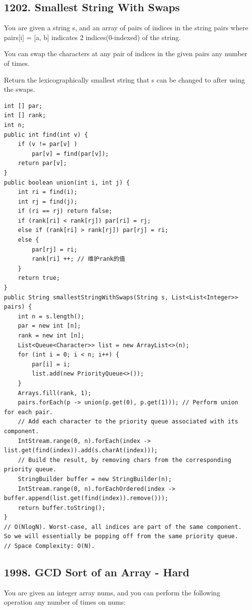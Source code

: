 \documentclass[9pt, b5paaper]{book}
\begin{document}
\subsection{1202. Smallest String With Swaps}
\label{sec-10-0-5}
You are given a string s, and an array of pairs of indices in the string pairs where pairs[i] = [a, b] indicates 2 indices(0-indexed) of the string.

You can swap the characters at any pair of indices in the given pairs any number of times.

Return the lexicographically smallest string that s can be changed to after using the swaps.
\begin{verbatim}
int [] par;
int [] rank;
int n;
public int find(int v) {
    if (v != par[v] ) 
        par[v] = find(par[v]);
    return par[v];
}
public boolean union(int i, int j) {
    int ri = find(i);
    int rj = find(j);
    if (ri == rj) return false;
    if (rank[ri] < rank[rj]) par[ri] = rj;
    else if (rank[ri] > rank[rj]) par[rj] = ri;
    else {
        par[rj] = ri;
        rank[ri] ++; // 维护rank的值
    }
    return true;
}
public String smallestStringWithSwaps(String s, List<List<Integer>> pairs) {
    int n = s.length();
    par = new int [n];
    rank = new int [n];
    List<Queue<Character>> list = new ArrayList<>(n);
    for (int i = 0; i < n; i++) {
        par[i] = i;
        list.add(new PriorityQueue<>());
    }
    Arrays.fill(rank, 1);
    pairs.forEach(p -> union(p.get(0), p.get(1))); // Perform union for each pair.
    // Add each character to the priority queue associated with its component.
    IntStream.range(0, n).forEach(index -> list.get(find(index)).add(s.charAt(index)));
    // Build the result, by removing chars from the corresponding priority queue.
    StringBuilder buffer = new StringBuilder(n);
    IntStream.range(0, n).forEachOrdered(index -> buffer.append(list.get(find(index)).remove()));
    return buffer.toString();
}
// O(NlogN). Worst-case, all indices are part of the same component. So we will essentially be popping off from the same priority queue.
// Space Complexity: O(N).
\end{verbatim}

\subsection{1998. GCD Sort of an Array - Hard}
\label{sec-10-0-6}
You are given an integer array nums, and you can perform the following operation any number of times on nums:
\end{document}
